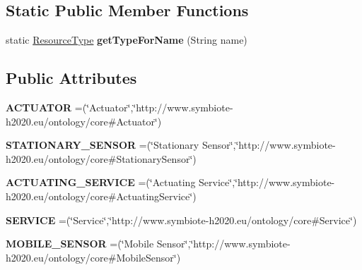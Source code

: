 \subsection*{Static Public Member Functions}
\begin{DoxyCompactItemize}
\item 
\mbox{\label{enumeu_1_1h2020_1_1symbiote_1_1core_1_1ci_1_1ResourceType_afd5b761700601e113f4f7d8fa1dd788d}} 
static \hyperlink{enumeu_1_1h2020_1_1symbiote_1_1core_1_1ci_1_1ResourceType}{Resource\+Type} {\bfseries get\+Type\+For\+Name} (String name)
\end{DoxyCompactItemize}
\subsection*{Public Attributes}
\begin{DoxyCompactItemize}
\item 
\mbox{\label{enumeu_1_1h2020_1_1symbiote_1_1core_1_1ci_1_1ResourceType_a3202d6202ca338aa3ec8b5efdcda8d76}} 
{\bfseries A\+C\+T\+U\+A\+T\+OR} =(\char`\"{}Actuator\char`\"{},\char`\"{}http\+://www.\+symbiote-\/h2020.\+eu/ontology/core\#Actuator\char`\"{})
\item 
\mbox{\label{enumeu_1_1h2020_1_1symbiote_1_1core_1_1ci_1_1ResourceType_ae425587112490a6b887e36766f934d03}} 
{\bfseries S\+T\+A\+T\+I\+O\+N\+A\+R\+Y\+\_\+\+S\+E\+N\+S\+OR} =(\char`\"{}Stationary Sensor\char`\"{},\char`\"{}http\+://www.\+symbiote-\/h2020.\+eu/ontology/core\#Stationary\+Sensor\char`\"{})
\item 
\mbox{\label{enumeu_1_1h2020_1_1symbiote_1_1core_1_1ci_1_1ResourceType_a0b7d3e135ceb33f480e122a218bfab52}} 
{\bfseries A\+C\+T\+U\+A\+T\+I\+N\+G\+\_\+\+S\+E\+R\+V\+I\+CE} =(\char`\"{}Actuating Service\char`\"{},\char`\"{}http\+://www.\+symbiote-\/h2020.\+eu/ontology/core\#Actuating\+Service\char`\"{})
\item 
\mbox{\label{enumeu_1_1h2020_1_1symbiote_1_1core_1_1ci_1_1ResourceType_a94117e7abd35dfc38a445e96b56520f8}} 
{\bfseries S\+E\+R\+V\+I\+CE} =(\char`\"{}Service\char`\"{},\char`\"{}http\+://www.\+symbiote-\/h2020.\+eu/ontology/core\#Service\char`\"{})
\item 
\mbox{\label{enumeu_1_1h2020_1_1symbiote_1_1core_1_1ci_1_1ResourceType_a00bba65c8b87f102cab7481c9c1c7f52}} 
{\bfseries M\+O\+B\+I\+L\+E\+\_\+\+S\+E\+N\+S\+OR} =(\char`\"{}Mobile Sensor\char`\"{},\char`\"{}http\+://www.\+symbiote-\/h2020.\+eu/ontology/core\#Mobile\+Sensor\char`\"{})
\end{DoxyCompactItemize}


